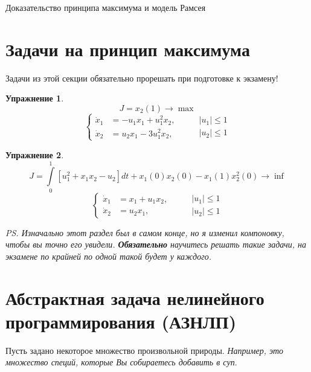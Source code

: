 \documentclass[12pt, a4paper]{article}
\theoremstyle{rusdef}
\newtheorem{exersize}{Упражнение}
\begin{document}
\parbox{11.8cm}{
  \begin{center}
    {\Huge Доказательство принципа максимума и модель Рамсея}
  \end{center}
}

\section*{Задачи на принцип максимума}
Задачи из этой секции обязательно прорешать при подготовке к экзамену!

\begin{exersize}
  \[ J = x_2(1) \to \max \]
  \[
    \left\{
    \begin{aligned}
      \dot{x}_1 & = -u_1 x_1 + u_1^2 x_2,  \\
      \dot{x}_2 & = u_2 x_1 - 3 u_1^2 x_2,
    \end{aligned}
    \right.
    \qquad
    \begin{matrix}
      |u_1| \leqslant 1 \\
      |u_2| \leqslant 1
    \end{matrix}
  \]
\end{exersize}

\begin{exersize}
  \[ J = \int\limits_0^1 \left[ u_1^2 + x_1 x_2 - u_2 \right] dt + x_1(0) x_2(0) - x_1(1) x_2^2(0) \to \inf \]
  \[
    \left\{
    \begin{aligned}
      \dot{x}_1 & = x_1 + u_1 x_2, \\
      \dot{x}_2 & = u_2 x_1,
    \end{aligned}
    \right.
    \qquad
    \begin{matrix}
      |u_1| \leqslant 1 \\
      |u_2| \leqslant 1
    \end{matrix}
  \]
\end{exersize}

\textit{PS. Изначально этот раздел был в самом конце, но я изменил компоновку, чтобы вы точно его увидели. \textbf{Обязательно} научитесь решать такие задачи, на экзамене по крайней по одной такой будет у каждого.}

\section{Абстрактная задача нелинейного программирования (АЗНЛП)}

Пусть задано некоторое множество произвольной природы. \textit{Например, это множество специй, которые Вы собираетесь добавить в суп}.
\end{document}
